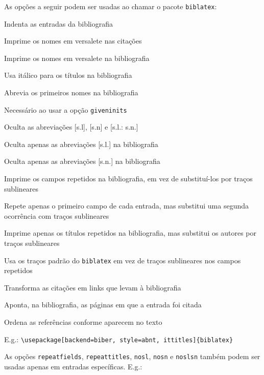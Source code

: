 \documentclass[a4paper]{article}
\begin{document}
As opções a seguir podem ser usadas ao chamar o pacote \texttt{biblatex}:

\begin{description}[parsep=8pt,itemindent=-1em,leftmargin=3em]
  \item [indent] Indenta as entradas da bibliografia
  \item [sccite] Imprime os nomes em versalete nas citações
  \item [scbib] Imprime os nomes em versalete na bibliografia
  \item [ittitles] Usa itálico para os títulos na bibliografia
  \item [giveninits] Abrevia os primeiros nomes na bibliografia
  \item [uniquename=init] Necessário ao usar a opção \texttt{giveninits}
  \item [noslsn] Oculta as abreviações [s.l], [s.n] e [s.l.: s.n.]
  \item [nosl] Oculta apenas as abreviações [s.l.] na bibliografia
  \item [nosn] Oculta apenas as abreviações [s.n.] na bibliografia
  \item [repeatfields] Imprime os campos repetidos na bibliografia, em vez de
    substituí-los por traços sublineares
  \item [repeatfirstfields] Repete apenas o primeiro campo de cada entrada,
    mas substitui uma segunda ocorrência com traços sublineares
  \item [repeattitles] Imprime apenas os títulos repetidos na bibliografia,
    mas substitui os autores por traços sublineares
  \item [usedashes] Usa os traços padrão do \texttt{biblatex} em vez de
    traços sublineares nos campos repetidos
  \item [hyperref] Transforma as citações em links que levam à bibliografia
  \item [backref] Aponta, na bibliografia, as páginas em que a entrada foi
    citada
  \item [sorting=none] Ordena as referências conforme aparecem no texto
\end{description}

\vspace{\baselineskip}
E.g.: \verb"\usepackage[backend=biber, style=abnt, ittitles]{biblatex}"

As opções \texttt{repeatfields}, \texttt{repeattitles}, \texttt{nosl},
\texttt{nosn} e \texttt{noslsn} também podem ser usadas apenas em entradas
específicas. E.g.:
\end{document}
